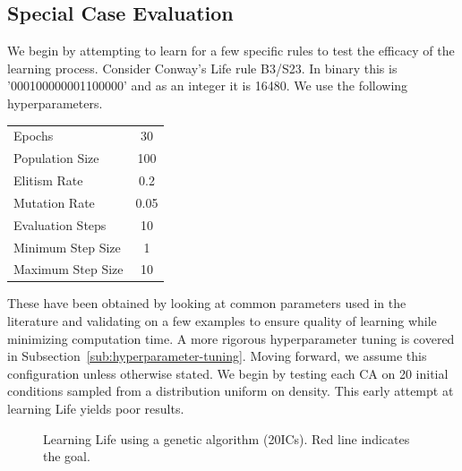 \subsection{Special Case Evaluation}

We begin by attempting to learn for a few specific rules to test the efficacy of the learning process. Consider Conway's Life rule B3/S23. In binary this is '000100000001100000' and as an integer it is 16480. We use the following hyperparameters.
\begin{center}
    \begin{tabular}{ l c }
        Epochs & 30\\
        Population Size & 100\\
        Elitism Rate & 0.2\\
        Mutation Rate & 0.05\\
        Evaluation Steps & 10\\
        Minimum Step Size & 1\\
        Maximum Step Size & 10\\
    \end{tabular}
\end{center}
These have been obtained by looking at common parameters used in the literature and validating on a few examples to ensure quality of learning while minimizing computation time. A more rigorous hyperparameter tuning is covered in Subsection~\ref{sub:hyperparameter-tuning}. Moving forward, we assume this configuration unless otherwise stated. We begin by testing each CA on 20 initial conditions sampled from a distribution uniform on density. This early attempt at learning Life yields poor results.

\begin{figure}[!h]
\centering
            \hfill
            \hfill
            \caption{Learning Life using a genetic algorithm (20ICs). Red line indicates the goal.}
\label{fig:life-nothing}
\end{figure}

